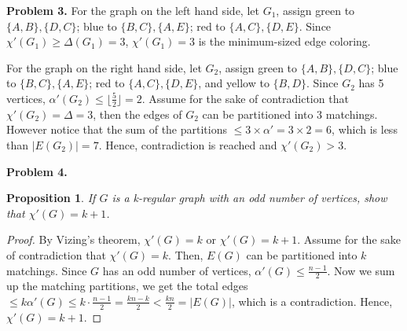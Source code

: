\documentclass{article}
\newtheorem{prop}[thm]{Proposition}
\begin{document}
\textbf{Problem 3.}
For the graph on the left hand side, let $G_1$, assign green to $\{A, B\}, \{D, C\}$; blue to $\{B, C\}, \{A, E\}$; red to $\{A, C\}, \{D, E\}$.
Since $\chi'(G_1) \ge \Delta(G_1) = 3$, $\chi'(G_1) = 3$ is the minimum-sized edge coloring.

For the graph on the right hand side, let $G_2$, assign green to $\{A, B\}, \{D, C\}$; blue to $\{B, C\}, \{A, E\}$; red to $\{A, C\}, \{D, E\}$, and yellow to $\{B, D\}$.
Since $G_2$ has 5 vertices, $\alpha'(G_2) \le \lfloor\frac{5}{2}\rfloor = 2$.
Assume for the sake of contradiction that $\chi'(G_2) = \Delta = 3$, then the edges of $G_2$ can be partitioned into 3 matchings.
However notice that the sum of the partitions $\le 3\times \alpha' = 3\times 2 = 6$, which is less than $|E(G_2)| = 7$. Hence, contradiction is reached and $\chi'(G_2) > 3$.
\bigbreak

\textbf{Problem 4.}
\begin{prop}
    If $G$ is a k-regular graph with an odd number of vertices, show that $\chi'(G) = k + 1$.
\end{prop}
\begin{proof}
    By Vizing's theorem, $\chi'(G) = k$ or $\chi'(G) = k + 1$.
    Assume for the sake of contradiction that $\chi'(G) = k$.
    Then, $E(G)$ can be partitioned into $k$ matchings.
    Since $G$ has an odd number of vertices, $\alpha'(G) \le \frac{n-1}{2}$.
    Now we sum up the matching partitions, we get the total edges $\le k \alpha'(G) \le k \cdot \frac{n-1}{2} = \frac{kn - k}{2} < \frac{kn}{2} = |E(G)|$, which is a contradiction.
    Hence, $\chi'(G) = k + 1$.
\end{proof}
\end{document}
